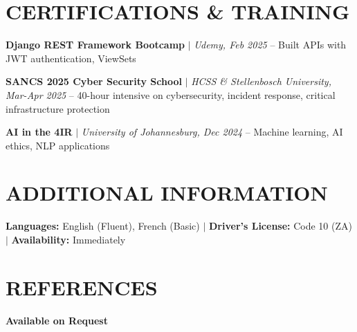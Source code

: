 \documentclass[9pt,a4paper]{article}
\begin{document}
\vspace{-2pt}

\section*{CERTIFICATIONS \& TRAINING}

\small
\textbf{Django REST Framework Bootcamp} $|$ \textit{Udemy, Feb 2025} -- Built APIs with JWT authentication, ViewSets

\textbf{SANCS 2025 Cyber Security School} $|$ \textit{HCSS \& Stellenbosch University, Mar-Apr 2025} -- 40-hour intensive on cybersecurity, incident response, critical infrastructure protection

\textbf{AI in the 4IR} $|$ \textit{University of Johannesburg, Dec 2024} -- Machine learning, AI ethics, NLP applications

\vspace{-2pt}

\section*{ADDITIONAL INFORMATION}
\small
\textbf{Languages:} English (Fluent), French (Basic) $|$ 
\textbf{Driver's License:} Code 10 (ZA) $|$ 
\textbf{Availability:} Immediately

\vspace{-2pt}

\section*{REFERENCES}
\small
\textbf{Available on Request}
\vspace{-2pt}
\end{document}
